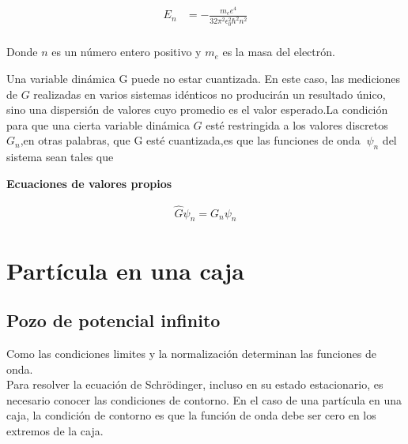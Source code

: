 \documentclass[a4paper]{article}
\begin{document}
    \begin{align*}
        E_n &= -\frac{m_e e^4}{32 \pi^2 \epsilon_0^2 \hbar^2 n^2} \\
    \end{align*}

    \indent Donde $n$ es un número entero positivo y $m_e$ es la masa del electrón. 

    \indent Una variable dinámica G puede no estar cuantizada. En este caso, las mediciones de $G$ realizadas en varios sistemas idénticos no producirán un resultado único, sino una dispersión de valores cuyo promedio es el valor esperado.La condición para que una cierta variable dinámica $G$ esté restringida a los valores discretos $G_n$,en otras palabras, que G esté cuantizada,es que las funciones de onda $\ \psi_n$ del sistema sean tales que

    \begin{minipage}[c]{7.5cm}

        \vspace{0.5cm}
        \centering
        \textbf{Ecuaciones de valores propios}
        \vspace{-5mm}

        \begin{align*}
            \hat{G} \psi_n = G_n \psi_n
        \end{align*}
    \end{minipage}

    \section{Partícula en una caja}

        \subsection{Pozo de potencial infinito}

        \indent Como las condiciones limites y la normalización determinan las funciones de onda.\\
        \indent Para resolver la ecuación de Schrödinger, incluso en su estado estacionario, es necesario conocer las condiciones de contorno. En el caso de una partícula en una caja, la condición de contorno es que la función de onda debe ser cero en los extremos de la caja.\\
\end{document}
